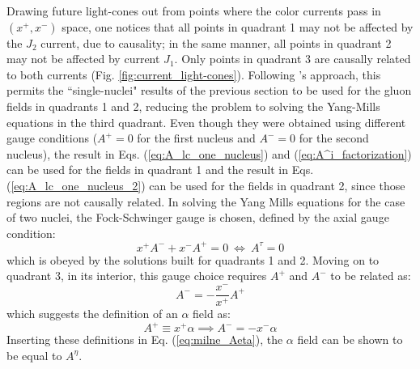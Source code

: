 Drawing future light-cones out from points where the color currents pass in $(x^+,x^-)$ space, one notices that all points in quadrant 1 may not be affected by the $J_2$ current, due to causality; in the same manner, all points in quadrant 2 may not be affected by current $J_1$. Only points in quadrant 3 are causally related to both currents (Fig. \ref{fig:current_light-cones}). Following \cite{Albacete:2018bbv}'s approach, this permits the ``single-nuclei" results of the previous section to be used for the gluon fields in quadrants 1 and 2, reducing the problem to solving the Yang-Mills equations in the third quadrant. Even though they were obtained using different gauge conditions ($A^+ = 0$ for the first nucleus and $A^- = 0$ for the second nucleus), the result in Eqs. (\ref{eq:A_lc_one_nucleus}) and (\ref{eq:A^i_factorization}) can be used for the fields in quadrant 1 and the result in Eqs. (\ref{eq:A_lc_one_nucleus_2}) can be used for the fields in quadrant 2, since those regions are not causally related. In solving the Yang Mills equations for the case of two nuclei, the Fock-Schwinger gauge is chosen, defined by the axial gauge condition:
\begin{equation}
	x^+ A^- + x^- A^+ = 0 ~ \Leftrightarrow ~ A^\tau = 0
\end{equation}
which is obeyed by the solutions built for quadrants 1 and 2. Moving on to quadrant 3, in its interior, this gauge choice requires $A^+$ and $A^-$ to be related as:
\begin{equation}
	A^- = -\frac{x^-}{x^+} A^+
\end{equation}
which suggests the definition of an $\alpha$ field as:
\begin{equation}
	A^+ \equiv x^+ \alpha \implies A^- = - x^- \alpha
\end{equation}
Inserting these definitions in Eq. (\ref{eq:milne_Aeta}), the $\alpha$ field can be shown to be equal to $A^\eta$.

